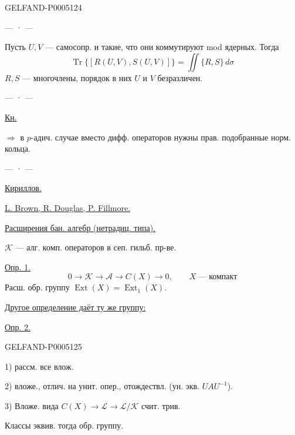 \begin{GelfandAdjacentEvidence}{GELFAND-P000512}{4}


\begin{center}— · —\end{center}
Пусть $U,V$ — самосопр. и такие, что они коммутируют mod ядерных.
Тогда
\[
\operatorname{Tr}\{[R(U,V),S(U,V)]\}=\iint\{R,S\}\,d\sigma
\]
$R,S$ — многочлены, порядок в них $U$ и $V$ безразличен.

\begin{center}— · —\end{center}
\uline{Кн.}\quad{}\quad{}

$\Rightarrow$ в $p$-адич. случае вместо дифф. операторов нужны прав. подобранные норм. кольца.

\begin{center}— · —\end{center}
\uline{Кириллов.}

\uline{L. Brown, R. Douglas, P. Fillmore.}

\uline{Расширения бан. алгебр (нетрадиц. типа).}

$\mathcal K$ — алг. комп. операторов в сеп. гильб. пр-ве.

\uline{Опр. 1.}
\[
0\to\mathcal K\to\mathcal A\to C(X)\to0,\qquad X\ \text{— компакт}
\]
Расш. обр. группу $\operatorname{Ext}(X)=\operatorname{Ext}_1(X)$.

\uline{Другое определение даёт ту же группу:}

\uline{Опр. 2.}
\end{GelfandAdjacentEvidence}
\begin{GelfandAdjacentEvidence}{GELFAND-P000512}{5}


1) рассм. все влож.

2) вложе., отлич. на унит. опер., отождествл. (ун. экв. $UAU^{-1}$).

3) Вложе. вида $C(X)\to\mathcal L\to\mathcal L/\mathcal K$ счит. трив.

Классы эквив. тогда обр. группу.
\end{GelfandAdjacentEvidence}
